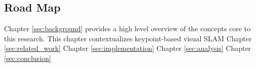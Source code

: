 \subsection{Road Map}

Chapter \ref{sec:background} provides a high level overview of the concepts core to this research. This chapter contextualizes keypoint-based visual SLAM 
Chapter \ref{sec:related_work}
Chapter \ref{sec:implementation}
Chapter \ref{sec:analysis}
Chapter \ref{sec:conclusion}